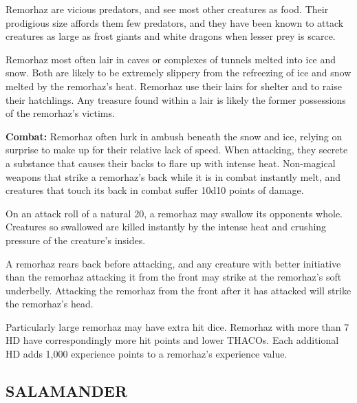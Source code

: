 \begin{multicols}{2}
Remorhaz are vicious predators, and see most other creatures as food. Their prodigious size affords them few predators, and they have been known to attack creatures as large as frost giants and white dragons when lesser prey is scarce.

Remorhaz most often lair in caves or complexes of tunnels melted into ice and snow. Both are likely to be extremely slippery from the refreezing of ice and snow melted by the remorhaz's heat. Remorhaz use their lairs for shelter and to raise their hatchlings. Any treasure found within a lair is likely the former possessions of the remorhaz's victims.

\textbf{Combat:} Remorhaz often lurk in ambush beneath the snow and ice, relying on surprise to make up for their relative lack of speed. When attacking, they secrete a substance that causes their backs to flare up with intense heat. Non-magical weapons that strike a remorhaz's back while it is in combat instantly melt, and creatures that touch its back in combat suffer 10d10 points of damage.

On an attack roll of a natural 20, a remorhaz may swallow its opponents whole. Creatures so swallowed are killed instantly by the intense heat and crushing pressure of the creature's insides.

A remorhaz rears back before attacking, and any creature with better initiative than the remorhaz attacking it from the front may strike at the remorhaz's soft underbelly. Attacking the remorhaz from the front after it has attacked will strike the remorhaz's head.

Particularly large remorhaz may have extra hit dice. Remorhaz with more than 7 HD have correspondingly more hit points and lower THACOs. Each additional HD adds 1,000 experience points to a remorhaz's experience value.

\noindent
\begin{minipage}{\columnwidth}

\vspace{1em}

\subsection{SALAMANDER}


\end{minipage}
\end{multicols}
